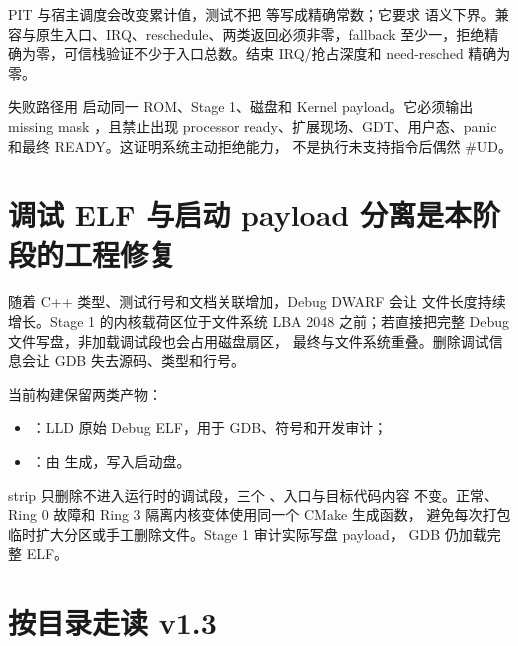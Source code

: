 PIT 与宿主调度会改变累计值，测试不把  等写成精确常数；它要求
语义下界。兼容与原生入口、IRQ、reschedule、两类返回必须非零，fallback
至少一，拒绝精确为零，可信栈验证不少于入口总数。结束 IRQ/抢占深度和
need-resched 精确为零。

失败路径用  启动同一 ROM、Stage 1、磁盘和
Kernel payload。它必须输出 missing mask ，且禁止出现 processor
ready、扩展现场、GDT、用户态、panic 和最终 READY。这证明系统主动拒绝能力，
不是执行未支持指令后偶然 \#UD。

\section{调试 ELF 与启动 payload 分离是本阶段的工程修复}

随着 C++ 类型、测试行号和文档关联增加，Debug DWARF 会让
 文件长度持续增长。Stage 1 的内核载荷区位于文件系统
LBA 2048 之前；若直接把完整 Debug 文件写盘，非加载调试段也会占用磁盘扇区，
最终与文件系统重叠。删除调试信息会让 GDB 失去源码、类型和行号。

当前构建保留两类产物：

\begin{itemize}
  \item {}：LLD 原始 Debug ELF，用于 GDB、符号和开发审计；
  \item {}：由
     生成，写入启动盘。
\end{itemize}

strip 只删除不进入运行时的调试段，三个 、入口与目标代码内容
不变。正常、Ring 0 故障和 Ring 3 隔离内核变体使用同一个 CMake 生成函数，
避免每次打包临时扩大分区或手工删除文件。Stage 1 审计实际写盘 payload，
GDB 仍加载完整 ELF。

\section{按目录走读 v1.3}


